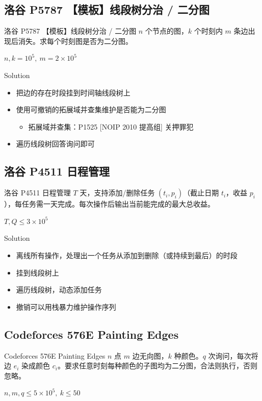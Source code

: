 ﻿\documentclass[aspectratio=169,handout]{ctexbeamer}
\begin{document}
\subsection{洛谷 P5787 【模板】线段树分治 / 二分图}
\begin{frame}{洛谷 P5787 【模板】线段树分治 / 二分图}
    $n$ 个节点的图，$k$ 个时刻内 $m$ 条边出现后消失。求每个时刻图是否为二分图。
    
    $n,k=10^5,\ m=2\times10^5$
\end{frame}

\begin{frame}{Solution}
    \begin{itemize}
        \item 把边的存在时段挂到时间轴线段树上
        \item 使用可撤销的拓展域并查集维护是否能为二分图
        \begin{itemize}
            \item 拓展域并查集：P1525 [NOIP 2010 提高组] 关押罪犯
        \end{itemize}
        \item 遍历线段树回答询问即可
    \end{itemize}
\end{frame}


\subsection{洛谷 P4511 日程管理}
\begin{frame}{洛谷 P4511 日程管理}
    $T$ 天，支持添加/删除任务 $(t_i,p_i)$（截止日期 $t_i$，收益 $p_i$），每任务需一天完成。每次操作后输出当前能完成的最大总收益。
    
    $T,Q\le 3\times10^5$
\end{frame}

\begin{frame}{Solution}
    \begin{itemize}
        \item 离线所有操作，处理出一个任务从添加到删除（或持续到最后）的时段
        \item 挂到线段树上
        \item 遍历线段树，动态添加任务
        \item 撤销可以用栈暴力维护操作序列
    \end{itemize}
\end{frame}





\subsection{Codeforces 576E Painting Edges}
\begin{frame}{Codeforces 576E Painting Edges}
    $n$ 点 $m$ 边无向图，$k$ 种颜色。$q$ 次询问，每次将边 $e_i$ 染成颜色 $c_i$。要求任意时刻每种颜色的子图均为二分图，合法则执行，否则忽略。
    
    $n,m,q\le 5\times10^5,\ k\le 50$
\end{frame}
\end{document}
